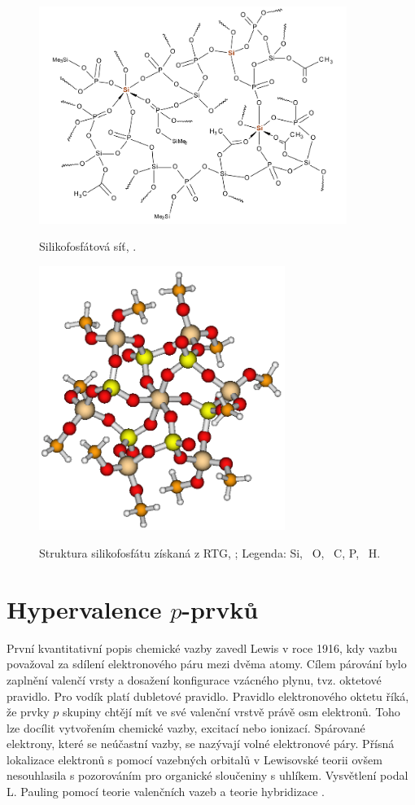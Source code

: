 \documentclass[
digital, %
table,   %
lof,     %
lot,     %
oneside,
]{fithesis3}
\begin{document}
\begin{figure}
\caption{Silikofosfátová síť, \cite{Styskalik2015thesis}.}\includegraphics[width=10cm]{si_polymer_cely.png}
\label{si_polymer_cely}\end{figure}

\begin{figure}
\caption{Struktura silikofosfátu získaná z RTG, \cite{C4TA06823H};  Legenda:  Si, ~O, ~C,  P, ~H. }
\center \includegraphics[width=8cm]{struktura_puvodni.png} \label{rtg_koordinace_sest} \end{figure}

\section{Hypervalence $p$-prvků}
První kvantitativní popis chemické vazby zavedl Lewis v roce 1916, kdy vazbu považoval za sdílení elektronového páru mezi dvěma atomy. Cílem párování bylo zaplnění valenčí vrsty a dosažení konfigurace vzácného plynu, tvz. oktetové pravidlo. Pro vodík platí dubletové pravidlo. Pravidlo elektronového oktetu říká, že  prvky $p$ skupiny chtějí mít ve své valenční vrstvě právě osm elektronů. Toho lze docílit vytvořením chemické vazby, excitací nebo ionizací. Spárované elektrony, které se neúčastní vazby, se nazývají volné elektronové páry. Přísná lokalizace elektronů s pomocí vazebných orbitalů v Lewisovské teorii ovšem nesouhlasila s pozorováním pro organické sloučeniny s uhlíkem. Vysvětlení podal L. Pauling pomocí teorie valenčních vazeb a teorie hybridizace \cite{Munzarova1996thesis}.\\
\end{document}
